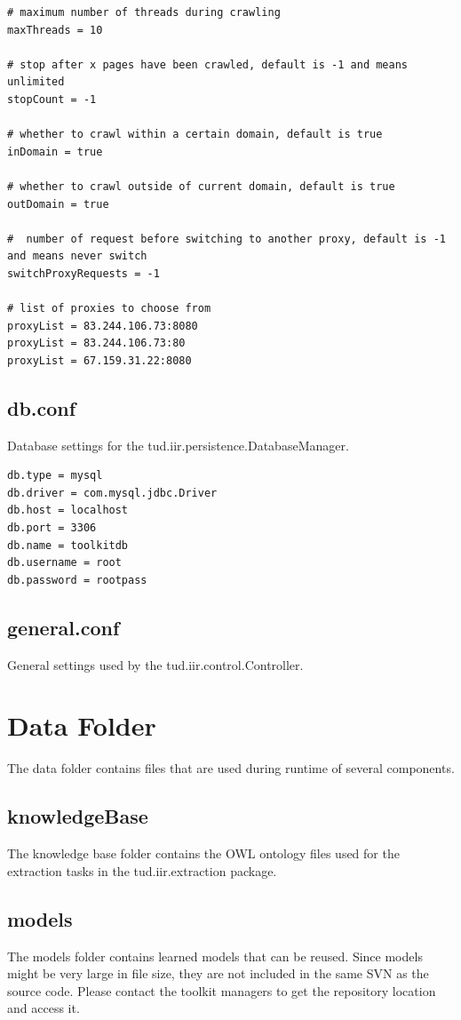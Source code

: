 \documentclass[a4paper,twoside]{book}      %
\begin{document}
\begin{verbatim}
# maximum number of threads during crawling
maxThreads = 10

# stop after x pages have been crawled, default is -1 and means unlimited
stopCount = -1

# whether to crawl within a certain domain, default is true
inDomain = true
	
# whether to crawl outside of current domain, default is true
outDomain = true

#  number of request before switching to another proxy, default is -1 and means never switch
switchProxyRequests = -1
	
# list of proxies to choose from
proxyList = 83.244.106.73:8080
proxyList = 83.244.106.73:80
proxyList = 67.159.31.22:8080
\end{verbatim}

\subsection{db.conf}
Database settings for the tud.iir.persistence.DatabaseManager.

\begin{verbatim}
db.type = mysql
db.driver = com.mysql.jdbc.Driver
db.host = localhost
db.port = 3306
db.name = toolkitdb
db.username = root
db.password = rootpass
\end{verbatim}

\subsection{general.conf}
General settings used by the tud.iir.control.Controller.

\section{Data Folder}
The data folder contains files that are used during runtime of several components.

\subsection{knowledgeBase} 
The knowledge base folder contains the OWL ontology files used for the extraction tasks in the tud.iir.extraction package.

\subsection{models}
The models folder contains learned models that can be reused. Since models might be very large in file size, they are not included in the same SVN as the source code. Please contact the toolkit managers to get the repository location and access it.
\end{document}
